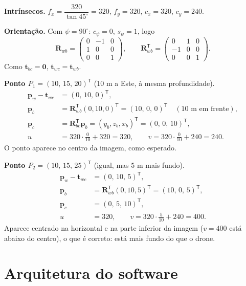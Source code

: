 \documentclass[11pt,a4paper]{article}
\newcommand{\vv}[1]{\mathbf{#1}}              %
\newcommand{\Rot}{\mathbf{R}}
\newcommand{\T}{^{\mathsf{T}}}
\theoremstyle{definition}
\begin{document}
\textbf{Intrínsecos.} $f_x=\dfrac{320}{\tan45^\circ}=320$, $f_y=320$, $c_x=320$, $c_y=240$.

\textbf{Orientação.} Com $\psi=90^\circ$: $c_\psi=0$, $s_\psi=1$, logo
\[
\Rot_{wb}=\begin{pmatrix}0&-1&0\\1&0&0\\0&0&1\end{pmatrix},\qquad
\Rot_{wb}\T=\begin{pmatrix}0&1&0\\-1&0&0\\0&0&1\end{pmatrix}.
\]
Como $\vv{t}_{bc}=\mathbf{0}$, $\vv{t}_{wc}=\vv{t}_{wb}$.

\textbf{Ponto $P_1=(10,\,15,\,20)\T$} (10 m a Este, à mesma profundidade).
\begin{align*}
\vv{p}_w-\vv{t}_{wc}&=(0,\,10,\,0)\T,\\
\vv{p}_b&=\Rot_{wb}\T(0,10,0)\T=(10,\,0,\,0)\T\quad(\text{10 m em frente}),\\
\vv{p}_c&=\Rot_{bc}\T\vv{p}_b=(y_b,z_b,x_b)\T=(0,\,0,\,10)\T,\\
u&=320\cdot\tfrac{0}{10}+320=320,\qquad v=320\cdot\tfrac{0}{10}+240=240.
\end{align*}
O ponto aparece no centro da imagem, como esperado.

\textbf{Ponto $P_2=(10,\,15,\,25)\T$} (igual, mas 5 m mais fundo).
\begin{align*}
\vv{p}_w-\vv{t}_{wc}&=(0,\,10,\,5)\T,\\
\vv{p}_b&=\Rot_{wb}\T(0,10,5)\T=(10,\,0,\,5)\T,\\
\vv{p}_c&=(0,\,5,\,10)\T,\\
u&=320,\qquad v=320\cdot\tfrac{5}{10}+240=400 .
\end{align*}
Aparece centrado na horizontal e na parte inferior da imagem ($v=400$ está abaixo do centro), o que é correto: está mais fundo do que o drone.

\section{Arquitetura do software}
\end{document}
